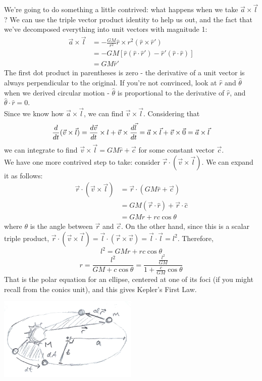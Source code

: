 We're going to do something a little contrived: what happens when we take $\vec a \times \vec l$? We can use the triple vector product identity to help us out, and the fact that we've decomposed everything into unit vectors with magnitude 1:
\begin{align*}
	\vec a \times \vec l &=  - \frac{GM}{r^2} \hat r \times r^2 (\hat r \times \hat r')\\
	&= -GM [ \hat r (\hat r \cdot \hat r') - \hat r' (\hat r \cdot \hat r) ]\\
	&= GM \hat r'
\end{align*}
The first dot product in parentheses is zero - the derivative of a unit vector is always perpendicular to the original. If you're not convinced, look at $\hat r$ and $\hat \theta$ when we derived circular motion - $\hat \theta$ is proportional to the derivative of $\hat r$, and $\hat \theta \cdot \hat r = 0$. \\
Since we know how $\vec a \times \vec l$, we can find $\vec v \times \vec l$. Considering that 
\[
	\frac{d }{d t} (\vec v \times \vec l) = \frac{d \vec v}{d t} \times l + \vec v \times \frac{d \vec l}{d t} = \vec a \times \vec l + \vec v \times \vec 0 = \vec a \times \vec l
\]
we can integrate to find $\vec v \times \vec l = GM \hat r + \vec c$ for some constant vector $\vec c$. \\
We have one more contrived step to take: consider $\vec r \cdot (\vec v \times \vec l)$. We can expand it as follows:
\begin{align*}
	\vec r \cdot (\vec v \times \vec l) &= \vec r \cdot (GM \hat r + \vec c) \\
	&= GM (\vec r \cdot \hat r) + \vec r \cdot \hat c\\
	&= GMr + rc \cos \theta
\end{align*}
where $\theta$ is the angle between $\vec r$ and $\vec c$. On the other hand, since this is a scalar triple product, $\vec r \cdot (\vec v \times \vec l) = \vec l \cdot (\vec r \times \vec v) = \vec l \cdot \vec l = l^2$. Therefore, 
\[
	l^2 = GMr + rc \cos \theta
\]
\[
	r = \frac{l^2}{GM + c \cos \theta} = \frac{\frac{l^2}{GM}}{1 + \frac{c}{GM} \cos \theta}
\]
That is the polar equation for an ellipse, centered at one of its foci (if you might recall from the conics unit), and this gives Kepler's First Law.\\
\begin{center}
	\includegraphics[width=0.5\textwidth]{images/mechintro/kepler-2.png}\\
\end{center}
